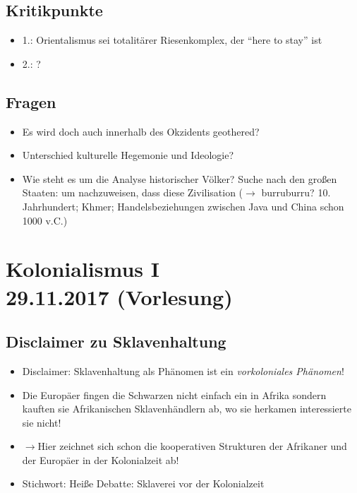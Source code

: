\documentclass[emulatestandardclasses]{scrartcl}
\begin{document}
\subsection{Kritikpunkte}

\begin{itemize}
  \item 1.: Orientalismus sei totalitärer Riesenkomplex, der "`here to stay"' ist
  \item 2.: ?
\end{itemize}


\subsection{Fragen}

\begin{itemize}
  \item Es wird doch auch innerhalb des Okzidents geothered?
  \item Unterschied kulturelle Hegemonie und Ideologie?
  \item Wie steht es um die Analyse historischer Völker? Suche nach den großen Staaten: um nachzuweisen, dass diese Zivilisation ($\rightarrow$ burruburru? 10. Jahrhundert; Khmer; Handelsbeziehungen zwischen Java und China schon 1000 v.C.)
\end{itemize}

\section{Kolonialismus I\\29.11.2017 (Vorlesung)}

\subsection{Disclaimer zu Sklavenhaltung}

\begin{itemize}
  \item Disclaimer: Sklavenhaltung als Phänomen ist ein \emph{vorkoloniales Phänomen}!
  \item Die Europäer fingen die Schwarzen nicht einfach ein in Afrika sondern kauften sie Afrikanischen Sklavenhändlern ab, wo sie herkamen interessierte sie nicht! 
  \item $\rightarrow$Hier zeichnet sich schon die kooperativen Strukturen der Afrikaner und der Europäer in der Kolonialzeit ab!
  \item Stichwort: Heiße Debatte: Sklaverei vor der Kolonialzeit
\end{itemize}
\end{document}
